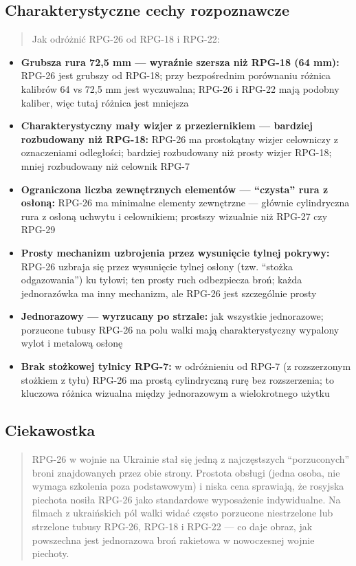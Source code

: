 \documentclass[12pt,oneside]{book}
\providecommand{\tightlist}{%
  \setlength{\itemsep}{0pt}\setlength{\parskip}{0pt}}
\begin{document}
\subsection{Charakterystyczne cechy
rozpoznawcze}\label{charakterystyczne-cechy-rozpoznawcze-86}

\begin{quote}
Jak odróżnić RPG-26 od RPG-18 i RPG-22:
\end{quote}

\begin{itemize}
\tightlist
\item
  \textbf{Grubsza rura 72,5 mm --- wyraźnie szersza niż RPG-18 (64 mm):}
  RPG-26 jest grubszy od RPG-18; przy bezpośrednim porównaniu różnica
  kalibrów 64 vs 72,5 mm jest wyczuwalna; RPG-26 i RPG-22 mają podobny
  kaliber, więc tutaj różnica jest mniejsza
\item
  \textbf{Charakterystyczny mały wizjer z przeziernikiem --- bardziej
  rozbudowany niż RPG-18:} RPG-26 ma prostokątny wizjer celowniczy z
  oznaczeniami odległości; bardziej rozbudowany niż prosty wizjer
  RPG-18; mniej rozbudowany niż celownik RPG-7
\item
  \textbf{Ograniczona liczba zewnętrznych elementów --- ``czysta'' rura
  z osłoną:} RPG-26 ma minimalne elementy zewnętrzne --- głównie
  cylindryczna rura z osłoną uchwytu i celownikiem; prostszy wizualnie
  niż RPG-27 czy RPG-29
\item
  \textbf{Prosty mechanizm uzbrojenia przez wysunięcie tylnej pokrywy:}
  RPG-26 uzbraja się przez wysunięcie tylnej osłony (tzw. ``stożka
  odgazowania'') ku tyłowi; ten prosty ruch odbezpiecza broń; każda
  jednorazówka ma inny mechanizm, ale RPG-26 jest szczególnie prosty
\item
  \textbf{Jednorazowy --- wyrzucany po strzale:} jak wszystkie
  jednorazowe; porzucone tubusy RPG-26 na polu walki mają
  charakterystyczny wypalony wylot i metalową osłonę
\item
  \textbf{Brak stożkowej tylnicy RPG-7:} w odróżnieniu od RPG-7 (z
  rozszerzonym stożkiem z tyłu) RPG-26 ma prostą cylindryczną rurę bez
  rozszerzenia; to kluczowa różnica wizualna między jednorazowym a
  wielokrotnego użytku
\end{itemize}

\subsection{Ciekawostka}\label{ciekawostka-86}

\begin{quote}
RPG-26 w wojnie na Ukrainie stał się jedną z najczęstszych
``porzuconych'' broni znajdowanych przez obie strony. Prostota obsługi
(jedna osoba, nie wymaga szkolenia poza podstawowym) i niska cena
sprawiają, że rosyjska piechota nosiła RPG-26 jako standardowe
wyposażenie indywidualne. Na filmach z ukraińskich pól walki widać
często porzucone niestrzelone lub strzelone tubusy RPG-26, RPG-18 i
RPG-22 --- co daje obraz, jak powszechna jest jednorazowa broń rakietowa
w nowoczesnej wojnie piechoty.
\end{quote}
\end{document}
